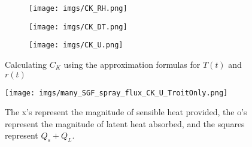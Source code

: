 \documentclass[10pt,a4paper]{article}
\begin{document}
\begin{figure}[h!]
    \centering
    \begin{subfigure}[t!]{0.33\textwidth}
        \texttt{[image: imgs/CK\_RH.png]} \caption{\label{fig:CK_RH}}   
    \end{subfigure}
    \begin{subfigure}[t!]{0.33\textwidth}
        \texttt{[image: imgs/CK\_DT.png]}   
        \caption{\label{fig:CK_DT}}
    \end{subfigure}
        \begin{subfigure}[t!]{0.3\textwidth}
        \texttt{[image: imgs/CK\_U.png]}   
        \caption{\label{fig:CK_U}}
    \end{subfigure}
       \caption{Calculating $C_K$ using the approximation formulas for $T(t)$ and $r(t)$ \label{fig:CK_fit}}
\end{figure}

\begin{figure}[h!]
    \centering
        \texttt{[image: imgs/many\_SGF\_spray\_flux\_CK\_U\_TroitOnly.png]} \caption{The x's represent the magnitude of sensible heat provided, the o's represent the magnitude of latent heat absorbed, and the squares represent $Q_s+Q_L$.\label{fig:Qs_min_QL}}   
\end{figure}
\end{document}
